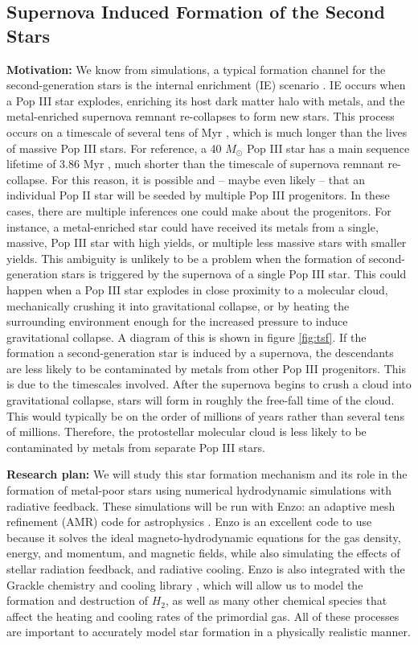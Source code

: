 \documentclass[a4paper, 12pt]{article}
\begin{document}
\subsection{Supernova Induced Formation of the Second Stars}
\label{sec:tsf}

\textbf{Motivation:} We know from simulations, a typical formation channel for the second-generation stars is the internal enrichment (IE) scenario \citep{Chiaki2019}. IE occurs when a Pop III star explodes, enriching its host dark matter halo with metals, and the metal-enriched supernova remnant re-collapses to form new stars. This process occurs on a timescale of several tens of Myr \citep{Chiaki2019}, which is much longer than the lives of massive Pop III stars. For reference, a 40 $M_\odot$ Pop III star has a main sequence lifetime of 3.86 Myr \citep{Schaerer2002}, much shorter than the timescale of supernova remnant re-collapse. For this reason, it is possible and -- maybe even likely -- that an individual Pop II star will be seeded by multiple Pop III progenitors. In these cases, there are multiple inferences one could make about the progenitors. For instance, a metal-enriched star could have received its metals from a single, massive, Pop III star with high yields, or multiple less massive stars with smaller yields. This ambiguity is unlikely to be a problem when the formation of second-generation stars is triggered by the supernova of a single Pop III star. This could happen when a Pop III star explodes in close proximity to a molecular cloud, mechanically crushing it into gravitational collapse, or by heating the surrounding environment enough for the increased pressure to induce gravitational collapse. A diagram of this is shown in figure \ref{fig:tsf}. If the formation a second-generation star is induced by a supernova, the descendants are less likely to be contaminated by metals from other Pop III progenitors. This is due to the timescales involved. After the supernova begins to crush a cloud into gravitational collapse, stars will form in roughly the free-fall time of the cloud. This would typically be on the order of millions of years rather than several tens of millions. Therefore, the protostellar molecular cloud is less likely to be contaminated by metals from separate Pop III stars. 

\textbf{Research plan:} We will study this star formation mechanism and its role in the formation of metal-poor stars using numerical hydrodynamic simulations with radiative feedback. These simulations will be run with Enzo: an adaptive mesh refinement (AMR) code for astrophysics \citep{Bryan2014}. Enzo is an excellent code to use because it solves the ideal magneto-hydrodynamic equations for the gas density, energy, and momentum, and magnetic fields, while also simulating the effects of stellar radiation feedback, and radiative cooling. Enzo is also integrated with the Grackle chemistry and cooling library \citep{Smith2017}, which will allow us to model the formation and destruction of $H_2$, as well as many other chemical species that affect the heating and cooling rates of the primordial gas. All of these processes are important to accurately model star formation in a physically realistic manner. 
\end{document}
